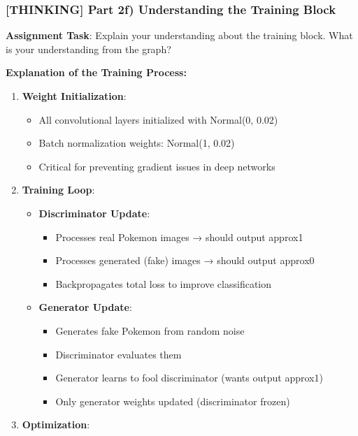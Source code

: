 \documentclass[11pt]{article}
\providecommand{\tightlist}{%
      \setlength{\itemsep}{0pt}\setlength{\parskip}{0pt}}
\begin{document}
    \subsubsection{{[}THINKING{]} Part 2f) Understanding the Training
Block}\label{thinking-part-2f-understanding-the-training-block}

\textbf{Assignment Task}: Explain your understanding about the training
block. What is your understanding from the graph?

\textbf{Explanation of the Training Process:}

\begin{enumerate}
\def\labelenumi{\arabic{enumi}.}
\tightlist
\item
  \textbf{Weight Initialization}:

  \begin{itemize}
  \tightlist
  \item
    All convolutional layers initialized with Normal(0, 0.02)
  \item
    Batch normalization weights: Normal(1, 0.02)
  \item
    Critical for preventing gradient issues in deep networks
  \end{itemize}
\item
  \textbf{Training Loop}:

  \begin{itemize}
  \tightlist
  \item
    \textbf{Discriminator Update}:

    \begin{itemize}
    \tightlist
    \item
      Processes real Pokemon images → should output approx1
    \item
      Processes generated (fake) images → should output approx0
    \item
      Backpropagates total loss to improve classification
    \end{itemize}
  \item
    \textbf{Generator Update}:

    \begin{itemize}
    \tightlist
    \item
      Generates fake Pokemon from random noise
    \item
      Discriminator evaluates them
    \item
      Generator learns to fool discriminator (wants output approx1)
    \item
      Only generator weights updated (discriminator frozen)
    \end{itemize}
  \end{itemize}
\item
  \textbf{Optimization}:


\end{enumerate}
\end{document}

